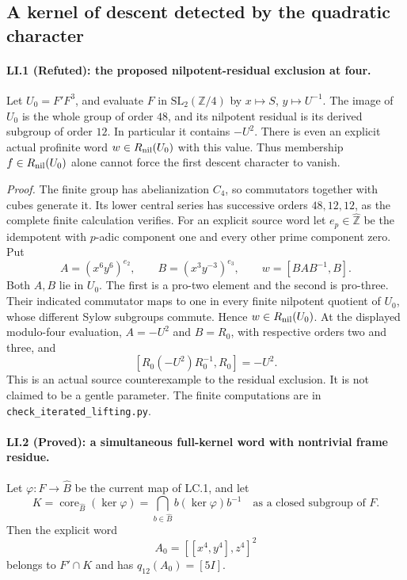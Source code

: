 \subsection{A kernel of descent detected by the quadratic character}

\paragraph{LI.1 (Refuted): the proposed nilpotent-residual exclusion at four.}
Let $U_0=F'F^3$, and evaluate $F$ in
$\mathrm{SL}_2(\mathbb Z/4)$ by $x\mapsto S$, $y\mapsto U^{-1}$.
The image of $U_0$ is the whole group of order $48$, and its
nilpotent residual is its derived subgroup of order $12$.
In particular it contains $-U^2$. There is even an explicit
actual profinite word $w\in R_{\rm nil}(U_0)$ with this value.
Thus membership $f\in R_{\rm nil}(U_0)$ alone cannot force
the first descent character to vanish.

\emph{Proof.}
The finite group has abelianization $C_4$, so commutators together
with cubes generate it. Its lower central series has successive
orders $48,12,12$, as the complete finite calculation verifies.
For an explicit source word let $e_p\in\widehat{\mathbb Z}$ be
the idempotent with $p$-adic component one and every other prime
component zero. Put
\[
 A=(x^6y^6)^{e_2},\qquad B=(x^3y^{-3})^{e_3},\qquad
 w=[BAB^{-1},B].
\]
Both $A,B$ lie in $U_0$. The first is a pro-two element and the
second is pro-three. Their indicated commutator maps to one in
every finite nilpotent quotient of $U_0$, whose different Sylow
subgroups commute. Hence $w\in R_{\rm nil}(U_0)$.
At the displayed modulo-four evaluation, $A=-U^2$ and $B=R_0$,
with respective orders two and three, and
\[
 [R_0(-U^2)R_0^{-1},R_0]=-U^2.
\]
This is an actual source counterexample to the residual exclusion.
It is not claimed to be a gentle parameter. The finite computations
are in \texttt{check\_iterated\_lifting.py}.

\paragraph{LI.2 (Proved): a simultaneous full-kernel word with nontrivial frame residue.}
Let $\varphi:F\to\widehat B$ be the current map of LC.1, and let
\[
 K=\operatorname{core}_{\widehat B}(\ker\varphi)
   =\bigcap_{b\in\widehat B} b(\ker\varphi)b^{-1}
       \quad\text{as a closed subgroup of }F.
\]
Then the explicit word
\[
                   A_0=[[x^4,y^4],z^4]^2
\]
belongs to $F'\cap K$ and has $q_{12}(A_0)=[5I]$.

